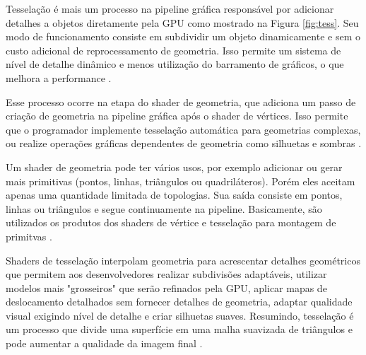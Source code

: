 Tesselação é mais um processo na pipeline gráfica responsável por adicionar detalhes a objetos diretamente pela GPU como mostrado na Figura \ref{fig:tess}. Seu modo de funcionamento consiste em subdividir um objeto dinamicamente e sem o custo adicional de reprocessamento de geometria. Isso permite um sistema de nível de detalhe dinâmico e menos utilização do barramento de gráficos, o que melhora a performance \cite{HLSLBook}.

\begin{figure}[h!]
	\centering
\end{figure}
\nocite{tesselation}

Esse processo ocorre na etapa do shader de geometria, que adiciona um passo de criação de geometria na pipeline gráfica após o shader de vértices. Isso permite que o programador implemente tesselação automática para geometrias complexas, ou realize operações gráficas dependentes de geometria como silhuetas e sombras \cite{bailey2007}.

Um shader de geometria pode ter vários usos, por exemplo adicionar ou gerar mais primitivas (pontos, linhas, triângulos ou quadriláteros). Porém eles aceitam apenas uma quantidade limitada de topologias. Sua saída consiste em pontos, linhas ou triângulos e segue continuamente na pipeline. Basicamente, são utilizados os produtos dos shaders de vértice e tesselação para montagem de primitvas \cite{hasu2018modern}.  

Shaders de tesselação interpolam geometria para acrescentar detalhes geométricos que permitem aos desenvolvedores realizar subdivisões adaptáveis, utilizar modelos mais "grosseiros" que serão refinados pela GPU, aplicar mapas de deslocamento detalhados sem fornecer detalhes de geometria, adaptar qualidade visual exigindo nível de detalhe e criar silhuetas suaves. Resumindo, tesselação é um processo que divide uma superfície em uma malha suavizada de triângulos e pode aumentar a qualidade da imagem final \cite{hasu2018modern}.

